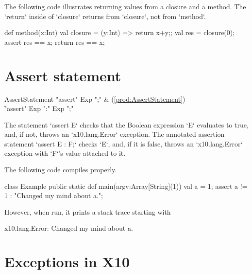 \begin{ex}
The following code illustrates returning values from a closure and a method.
The \xcd`return` inside of \xcd`closure` returns from \xcd`closure`, not from
\xcd`method`.  
\begin{xten}
def method(x:Int) {
  val closure = (y:Int) => {return x+y;}; 
  val res = closure(0);
  assert res == x;
  return res == x;
}
\end{xten}


\end{ex}


\section{Assert statement} 

\begin{bbgrammar}
     AssertStatement \: \xcd"assert" Exp \xcd";" & (\ref{prod:AssertStatement}) \\
                     \| \xcd"assert" Exp  \xcd":" Exp  \xcd";" \\
\end{bbgrammar}

The statement \xcd`assert E` checks that the Boolean expression \xcd`E`
evaluates to true, and, if not, throws an \xcd`x10.lang.Error`  exception.  
The annotated assertion statement \xcd`assert E : F;` checks \xcd`E`, and, if
it is 
false, throws an \xcd`x10.lang.Error` exception with \xcd`F`'s value attached
to it. 

\begin{ex}
The following code compiles properly.  
% 
\begin{xten}
class Example {
  public static def main(argv:Array[String](1)) {
    val a = 1;
    assert a != 1 : "Changed my mind about a.";
  }
}
\end{xten}
\noindent
However, when run, it 
prints a stack trace starting with 
\begin{xten}
x10.lang.Error: Changed my mind about a.
\end{xten}
\end{ex}

\section{Exceptions in X10}

